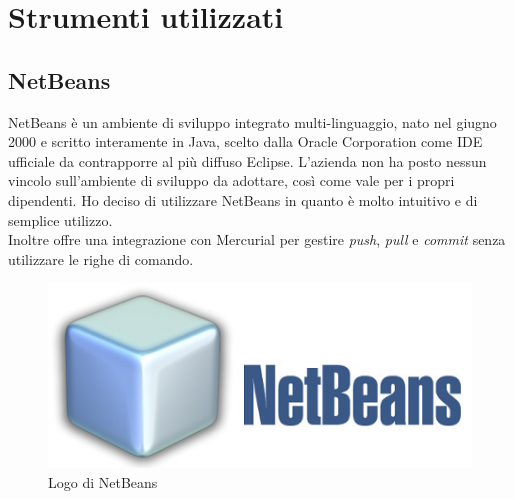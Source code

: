 \section{Strumenti utilizzati}
\subsection{NetBeans}
NetBeans è un ambiente di sviluppo integrato multi-linguaggio, nato nel giugno 2000 e scritto interamente in Java, scelto dalla Oracle Corporation come \gls{IDE} ufficiale da contrapporre al più diffuso Eclipse.
L'azienda non ha posto nessun vincolo sull'ambiente di sviluppo da adottare, così come vale per i propri dipendenti. Ho deciso di utilizzare NetBeans in quanto è molto intuitivo e di semplice utilizzo.\\
Inoltre offre una integrazione con \gls{Mercurial} per gestire \emph{push}, \emph{pull} e \emph{commit} senza utilizzare le righe di comando.
\begin{figure}[h]
	\centering
	\includegraphics[scale=0.4]{../Immagini/netbeans.jpg}
	\caption{Logo di NetBeans}
\end{figure}
